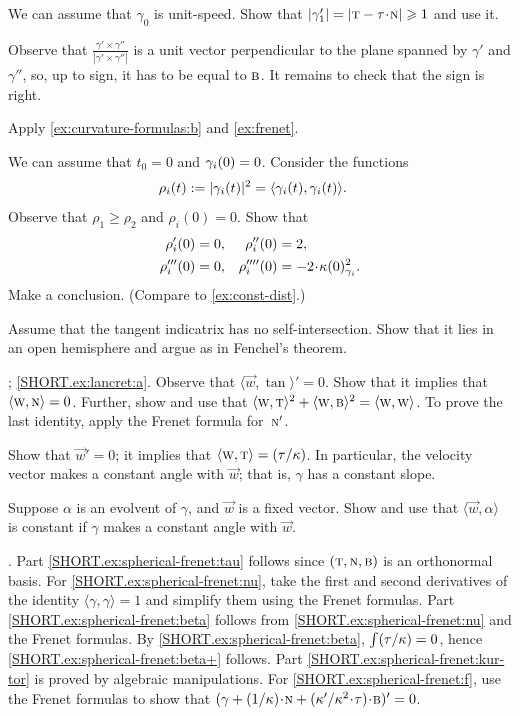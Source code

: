 We can assume that $\gamma_0$ is unit-speed.
Show that
$|\gamma_1'|=|\tan-\tor\cdot \norm|\ge 1$ and use it.

Observe that $\tfrac{\gamma'\times\gamma''}{|\gamma'\times\gamma''|}$ is a unit vector perpendicular to the plane spanned by $\gamma'$ and $\gamma''$, so, up to sign, it has to be equal to $\text{\sc{b}}$.
It remains to check that the sign is right.

 Apply \ref{ex:curvature-formulas:b} and \ref{ex:frenet}.

We can assume that $t_0=0$ and $\gamma_i(0)\z=0$.
Consider the functions
\begin{align*}
\rho_i(t)&\mathrel{:=}|\gamma_i(t)|^2=\langle \gamma_i(t),\gamma_i(t)\rangle.
\end{align*}
Observe that $\rho_1\ge \rho_2$ and $\rho_i(0)=0$.
Show that 
\begin{align*}
\rho_i'(0)&=0,
&
\rho_i''(0)&=2,
\\
\rho_i'''(0)&=0,
&
\rho_i''''(0)&=-2\cdot\kur(0)^2_{\gamma_i}.
\end{align*}
Make a conclusion. (Compare to \ref{ex:const-dist}.)

 Assume that the tangent indicatrix has no self-intersection.
Show that it lies in an open hemisphere and argue as in Fenchel's theorem.

\parbf{\ref{ex:lancret}}; \ref{SHORT.ex:lancret:a}.
Observe that 
$\langle \vec w,\tan\rangle'=0$.
Show that it implies that $\langle \text{\sc{w}}, \text{\sc{n}}\rangle =0$.
Further, show and use that $\langle \text{\sc{w}}, \text{\sc{t}}\rangle^2+\langle \text{\sc{w}}, \text{\sc{b}}\rangle^2=\langle \text{\sc{w}}, \text{\sc{w}}\rangle$.
To prove the last identity, apply the Frenet formula for~$\text{\sc{n}}'$.

Show that $\vec w'=0$;
it implies that $\langle \vec w,\tan\rangle\z=\tfrac\tor\kur$.
In particular, the velocity vector makes a constant angle with $\vec w$; that is, $\gamma$ has a constant slope.

Suppose $\alpha$ is an evolvent of $\gamma$, and $\vec w$ is a fixed vector.
Show and use that $\langle \vec w,\alpha\rangle$ is constant if $\gamma$ makes a constant angle with $\vec w$.

\parbf{\ref{ex:spherical-frenet}}.
Part \ref{SHORT.ex:spherical-frenet:tau} follows since $(\text{\sc{t}},\text{\sc{n}},\text{\sc{b}})$ is an orthonormal basis.
For \ref{SHORT.ex:spherical-frenet:nu}, take the first and second derivatives of the identity $\langle\gamma,\gamma\rangle=1$ and simplify them using the Frenet formulas.
Part \ref{SHORT.ex:spherical-frenet:beta} follows from \ref{SHORT.ex:spherical-frenet:nu} and the Frenet formulas.
By \ref{SHORT.ex:spherical-frenet:beta}, $\int(\tau/\kappa)=0$, hence \ref{SHORT.ex:spherical-frenet:beta+} follows.
Part \ref{SHORT.ex:spherical-frenet:kur-tor} is proved by algebraic manipulations.
For \ref{SHORT.ex:spherical-frenet:f},
use the Frenet formulas to show that $(\gamma+\tfrac1\kur\cdot \norm+\tfrac{\kur'}{\kur^2\cdot\tor}\cdot\bi)'=0$.

